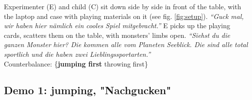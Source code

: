 \documentclass{article}
\begin{document}
Experimenter (E) and child (C) sit down side by side in front of the table, with the laptop and case with playing materials on it (see fig. \ref{fig:setup}).
\emph{``Guck mal, wir haben hier nämlich ein cooles Spiel mitgebracht.''}
E picks up the playing cards, scatters them on the table, with monsters' limbs open.
\emph{``Siehst du die ganzen Monster hier?
Die kommen alle vom Planeten Seeblick.
Die sind alle total sportlich und die haben zwei Lieblingssportarten.''} \\

Counterbalance: \{\textbf{jumping first} \textbar{} throwing first\}



\subsection{Demo 1: jumping, "Nachgucken"}\label{demo-1-jumping-nachgucken}
\end{document}
